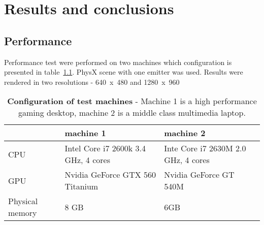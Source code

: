 

\chapter{Results and conclusions}

\graphicspath{{results/figures/}}


\section{Performance}


Performance test were performed on two machines which configuration is presented in table~\ref{tab:test_configuration}. PhysX scene with one emitter was used. Results were rendered in two resolutions - 640~x~480 and 1280~x~960





\begin{table}   
    \caption[Configuration of test machines]{\textbf{Configuration of test machines} - Machine 1 is a high performance gaming desktop, machine 2 is a middle class multimedia laptop.}
    \centering
    \begin{tabular}{ l | p{4.5cm} | p{4.5cm} }
                                         & machine 1                                             & machine 2 \\ \hline
        CPU                           & Intel Core i7 2600k 3.4 GHz, 4 cores  & Inte Core i7 2630M 2.0 GHz, 4 cores \\ \hline
        GPU                           & Nvidia GeForce GTX 560 Titanium        &  Nvidia GeForce GT 540M \\ \hline
        Physical memory       & 8 GB                                                      & 6GB \\
    \end{tabular}
    \label{tab:test_configuration}
\end{table}

